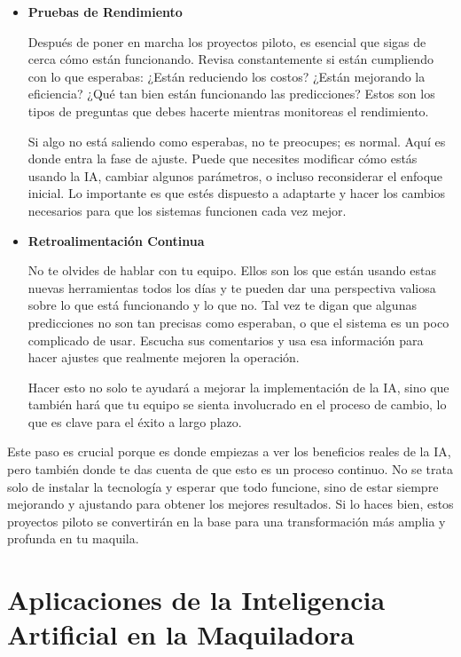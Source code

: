 \documentclass[
  10pt,
  letterpaper,
]{book}
\begin{document}
\begin{itemize}
\item
  \textbf{Pruebas de Rendimiento}

  Después de poner en marcha los proyectos piloto, es esencial que sigas
  de cerca cómo están funcionando. Revisa constantemente si están
  cumpliendo con lo que esperabas: ¿Están reduciendo los costos? ¿Están
  mejorando la eficiencia? ¿Qué tan bien están funcionando las
  predicciones? Estos son los tipos de preguntas que debes hacerte
  mientras monitoreas el rendimiento.

  Si algo no está saliendo como esperabas, no te preocupes; es normal.
  Aquí es donde entra la fase de ajuste. Puede que necesites modificar
  cómo estás usando la IA, cambiar algunos parámetros, o incluso
  reconsiderar el enfoque inicial. Lo importante es que estés dispuesto
  a adaptarte y hacer los cambios necesarios para que los sistemas
  funcionen cada vez mejor.
\item
  \textbf{Retroalimentación Continua}

  No te olvides de hablar con tu equipo. Ellos son los que están usando
  estas nuevas herramientas todos los días y te pueden dar una
  perspectiva valiosa sobre lo que está funcionando y lo que no. Tal vez
  te digan que algunas predicciones no son tan precisas como esperaban,
  o que el sistema es un poco complicado de usar. Escucha sus
  comentarios y usa esa información para hacer ajustes que realmente
  mejoren la operación.

  Hacer esto no solo te ayudará a mejorar la implementación de la IA,
  sino que también hará que tu equipo se sienta involucrado en el
  proceso de cambio, lo que es clave para el éxito a largo plazo.
\end{itemize}

Este paso es crucial porque es donde empiezas a ver los beneficios
reales de la IA, pero también donde te das cuenta de que esto es un
proceso continuo. No se trata solo de instalar la tecnología y esperar
que todo funcione, sino de estar siempre mejorando y ajustando para
obtener los mejores resultados. Si lo haces bien, estos proyectos piloto
se convertirán en la base para una transformación más amplia y profunda
en tu maquila.


\chapter{Aplicaciones de la Inteligencia Artificial en la
Maquiladora}\label{aplicaciones-de-la-inteligencia-artificial-en-la-maquiladora}
\end{document}
